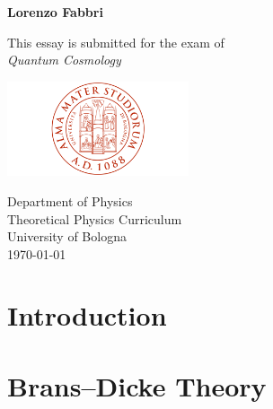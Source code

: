 \documentclass[a4paper,12pt,oneside,customfont,custombib,PageStyleII]{Settings/PhDThesisPSnPDF}
\begin{document}
\begin{titlepage}
    \begin{center}
        \vspace*{1cm}
            
        \Huge            
        \vspace{4cm}
        \Large    
        \textbf{Lorenzo Fabbri}
            
        \vfill
        \large   
        This essay is submitted for the exam of\\
        \textit{Quantum Cosmology}
            
        \vspace{0.8cm}
            
        \includegraphics[width=0.4\textwidth]{Graphics/UniversityCrest.png}
            
        \large
        Department of Physics\\
        Theoretical Physics Curriculum\\
        University of Bologna\\
        \today
            
    \end{center}
\end{titlepage}

\begin{spacing}{1.3}
    \tableofcontents
\end{spacing}

\mainmatter

\chapter*{Introduction}\label{chap:Introduction}


\chapter{Brans–Dicke Theory}\label{chap:chapter1}



\end{document}
